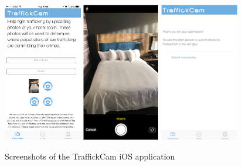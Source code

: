 \documentclass[letterpaper]{article} %
\begin{document}
\begin{figure}
    \centering
    \includegraphics[height=2.4in]{figures/screenshots/1.png}
    \includegraphics[height=2.4in]{figures/screenshots/2.png}
    \includegraphics[height=2.4in]{figures/screenshots/3.png}
    \caption{Screenshots of the TraffickCam iOS application}
    \label{fig:tcamScreenshots}
\end{figure}
\end{document}
